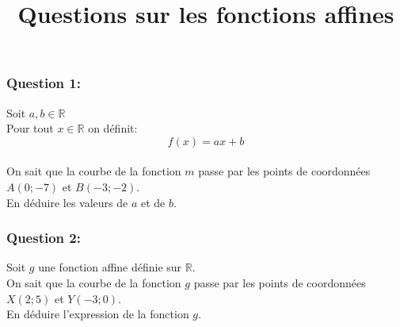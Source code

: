 \documentclass[t,12pt]{beamer}
\title{Questions sur les fonctions affines}
\author{}
\date{}
\newcommand{\R}{\mathbb{R}}
\begin{document}
\maketitle	

\begin{frame}
	\frametitle{Question 1: }
		Soit $a,b \in \R$ \\
	Pour tout  $x\in\R$ on définit: $$f(x) = ax + b $$ \hfill\\[-0.2cm]
	
On sait que la courbe de la fonction $m$ passe par les points de coordonnées $A(0;-7)$ et $B(-3;-2)$. \\[0.2cm] En déduire les valeurs de $a$ et de $b$.\\ 
		

	

\end{frame}

\begin{frame}
	\frametitle{Question 2: }
	
	Soit $g$ une fonction affine définie sur $\R$.\hfill\\[0.2cm]

 On sait que la courbe de la fonction $g$ passe par les points de coordonnées $X(2;5)$ et $Y(-3;0)$. \\[0.2cm] En déduire l'expression de la fonction $g$.\\ 
		
		

	
\end{frame}
\end{document}
